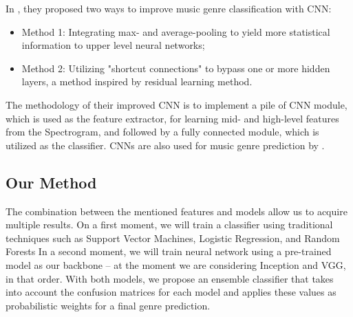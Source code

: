 In \citet{Zhang2016}, they proposed two ways to improve music genre classification with CNN:

\begin{itemize}
    \item Method 1: Integrating max- and average-pooling to yield more statistical information to upper level neural networks;
    \item Method 2: Utilizing "shortcut connections" to bypass one or more hidden layers, a method inspired by residual learning method.
\end{itemize}

The methodology of their improved CNN is to implement a pile of CNN module, which is used as the feature extractor, for learning mid- and high-level features from the Spectrogram, and followed by a fully connected module, which is utilized as the classifier. CNNs are also used for music genre prediction by \citet{Bahuleyan2018}.

\subsection{Our Method}

The combination between the mentioned features and models allow us to acquire multiple results. On a first moment, we will train a classifier using traditional techniques such as Support Vector Machines, Logistic Regression, and Random Forests  In a second moment, we will train neural network using a pre-trained model as our backbone -- at the moment we are considering Inception and VGG, in that order. With both models, we propose an ensemble classifier that takes into account the confusion matrices for each model and applies these values as probabilistic weights for a final genre prediction.


